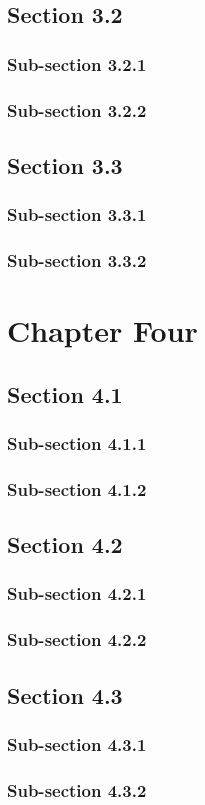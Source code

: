 \documentclass[a4paper,12pt]{book}
\begin{document}
\section{Section 3.2}
\subsection{Sub-section 3.2.1}
\lipsum[29-30]
\subsection{Sub-section 3.2.2}
\lipsum[31-32]

\section{Section 3.3}
\subsection{Sub-section 3.3.1}
\lipsum[33-34]
\subsection{Sub-section 3.3.2}
\lipsum[35-36]

\chapter{Chapter Four}
\section{Section 4.1}
\subsection{Sub-section 4.1.1}
\lipsum[37-38]
\subsection{Sub-section 4.1.2}
\lipsum[39-40]

\section{Section 4.2}
\subsection{Sub-section 4.2.1}
\lipsum[41-42]
\subsection{Sub-section 4.2.2}
\lipsum[43-44]

\section{Section 4.3}
\subsection{Sub-section 4.3.1}
\lipsum[45-46]
\subsection{Sub-section 4.3.2}
\lipsum[47-48]
\end{document}
